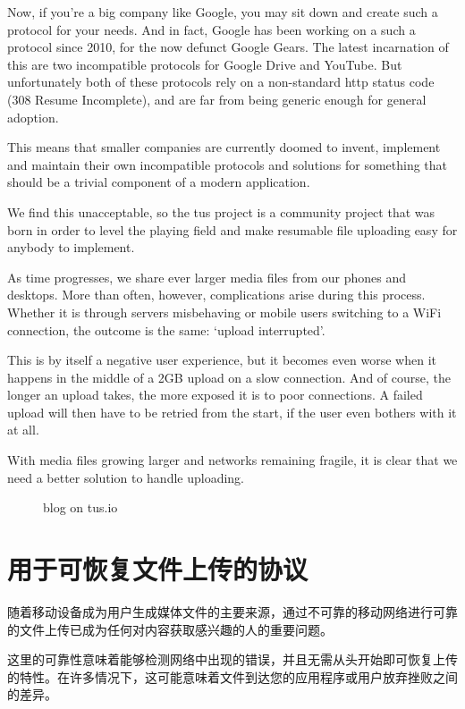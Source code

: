 \documentclass[bachelor]{thesis-uestc}
\begin{document}
Now, if you’re a big company like Google, you may sit down and create such a protocol for your needs. And in fact, Google has been working on a such a protocol since 2010, for the now defunct Google Gears. The latest incarnation of this are two incompatible protocols for Google Drive and YouTube. But unfortunately both of these protocols rely on a non-standard http status code (308 Resume Incomplete), and are far from being generic enough for general adoption.

This means that smaller companies are currently doomed to invent, implement and maintain their own incompatible protocols and solutions for something that should be a trivial component of a modern application.

We find this unacceptable, so the tus project is a community project that was born in order to level the playing field and make resumable file uploading easy for anybody to implement.

As time progresses, we share ever larger media files from our phones and desktops. More than often, however, complications arise during this process. Whether it is through servers misbehaving or mobile users switching to a WiFi connection, the outcome is the same: ‘upload interrupted’.

This is by itself a negative user experience, but it becomes even worse when it happens in the middle of a 2GB upload on a slow connection. And of course, the longer an upload takes, the more exposed it is to poor connections. A failed upload will then have to be retried from the start, if the user even bothers with it at all.

With media files growing larger and networks remaining fragile, it is clear that we need a better solution to handle uploading.

\begin{figure}[h]
\caption{blog on tus.io}
\end{figure}

\thesistranslationchinese
\section{用于可恢复文件上传的协议}
随着移动设备成为用户生成媒体文件的主要来源，通过不可靠的移动网络进行可靠的文件上传已成为任何对内容获取感兴趣的人的重要问题。

这里的可靠性意味着能够检测网络中出现的错误，并且无需从头开始即可恢复上传的特性。在许多情况下，这可能意味着文件到达您的应用程序或用户放弃挫败之间的差异。
\end{document}

